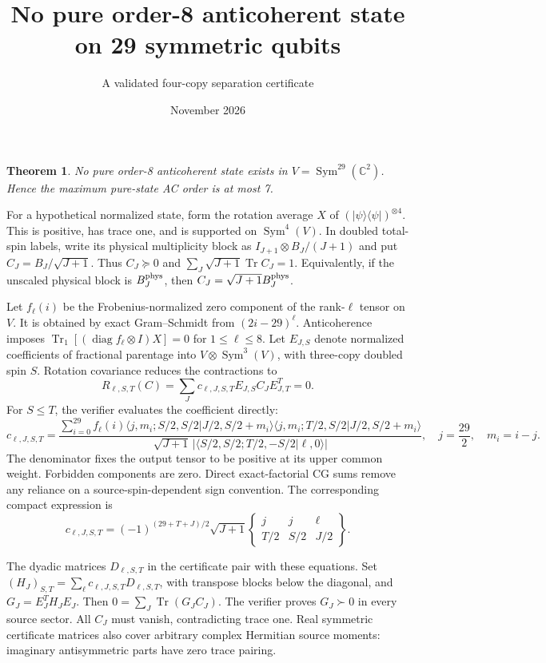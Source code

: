 \documentclass[11pt]{article}
\newtheorem{theorem}{Theorem}
\newcommand{\Tr}{\operatorname{Tr}}
\begin{document}
\title{No pure order-8 anticoherent state on 29 symmetric qubits}
\author{A validated four-copy separation certificate}\date{November 2026}\maketitle
\begin{theorem}No pure order-8 anticoherent state exists in $V=\operatorname{Sym}^{29}(\mathbb C^2)$. Hence the maximum pure-state AC order is at most 7.\end{theorem}
For a hypothetical normalized state, form the rotation average $X$ of $(|\psi\rangle\langle\psi|)^{\otimes4}$. This is positive, has trace one, and is supported on $\operatorname{Sym}^4(V)$. In doubled total-spin labels, write its physical multiplicity block as $I_{J+1}\otimes B_J/(J+1)$ and put $C_J=B_J/\sqrt{J+1}$. Thus $C_J\succeq0$ and $\sum_J\sqrt{J+1}\Tr C_J=1$. Equivalently, if the unscaled physical block is $B_J^{\rm phys}$, then $C_J=\sqrt{J+1}B_J^{\rm phys}$.

Let $f_\ell(i)$ be the Frobenius-normalized zero component of the rank-$\ell$ tensor on $V$. It is obtained by exact Gram--Schmidt from $(2i-29)^\ell$. Anticoherence imposes $\Tr_1[(\operatorname{diag}f_\ell\otimes I)X]=0$ for $1\le\ell\le 8$. Let $E_{J,S}$ denote normalized coefficients of fractional parentage into $V\otimes\operatorname{Sym}^3(V)$, with three-copy doubled spin $S$. Rotation covariance reduces the contractions to
\[
 R_{\ell,S,T}(C)=\sum_Jc_{\ell,J,S,T}E_{J,S}C_JE_{J,T}^T=0.
\]
For $S\le T$, the verifier evaluates the coefficient directly:
\[
 c_{\ell,J,S,T}=\frac{\sum_{i=0}^{29}f_\ell(i)
 \langle j,m_i;S/2,S/2|J/2,S/2+m_i\rangle
 \langle j,m_i;T/2,S/2|J/2,S/2+m_i\rangle}
 {\sqrt{J+1}\,|\langle S/2,S/2;T/2,-S/2|\ell,0\rangle|},
 \quad j=\frac{29}{2},\quad m_i=i-j.
\]
The denominator fixes the output tensor to be positive at its upper common weight. Forbidden components are zero. Direct exact-factorial CG sums remove any reliance on a source-spin-dependent sign convention. The corresponding compact expression is
\[
 c_{\ell,J,S,T}=(-1)^{(29+T+J)/2}\sqrt{J+1}
 \begin{Bmatrix}j&j&\ell\\T/2&S/2&J/2\end{Bmatrix}.
\]

The dyadic matrices $D_{\ell,S,T}$ in the certificate pair with these equations. Set $(H_J)_{S,T}=\sum_\ell c_{\ell,J,S,T}D_{\ell,S,T}$, with transpose blocks below the diagonal, and $G_J=E_J^TH_JE_J$. Then $0=\sum_J\Tr(G_JC_J)$. The verifier proves $G_J\succ0$ in every source sector. All $C_J$ must vanish, contradicting trace one. Real symmetric certificate matrices also cover arbitrary complex Hermitian source moments: imaginary antisymmetric parts have zero trace pairing.
\end{document}
